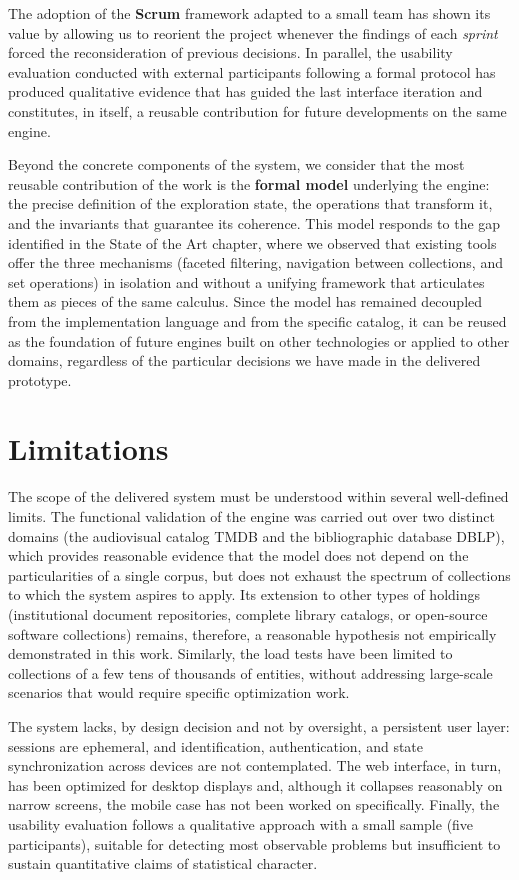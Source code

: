 The adoption of the \textbf{Scrum} framework adapted to a small team has shown its value by
allowing us to reorient the project whenever the findings of each \textit{sprint} forced the
reconsideration of previous decisions. In parallel, the usability evaluation conducted with
external participants following a formal protocol has produced qualitative evidence that has
guided the last interface iteration and constitutes, in itself, a reusable contribution for
future developments on the same engine.

Beyond the concrete components of the system, we consider that the most reusable contribution
of the work is the \textbf{formal model} underlying the engine: the precise definition of the
exploration state, the operations that transform it, and the invariants that guarantee its
coherence. This model responds to the gap identified in the State of the Art chapter, where
we observed that existing tools offer the three mechanisms (faceted filtering, navigation
between collections, and set operations) in isolation and without a unifying framework that
articulates them as pieces of the same calculus. Since the model has remained decoupled from
the implementation language and from the specific catalog, it can be reused as the foundation
of future engines built on other technologies or applied to other domains, regardless of the
particular decisions we have made in the delivered prototype.

\section*{Limitations}

The scope of the delivered system must be understood within several well-defined limits. The
functional validation of the engine was carried out over two distinct domains (the audiovisual
catalog TMDB and the bibliographic database DBLP), which provides reasonable evidence that the
model does not depend on the particularities of a single corpus, but does not exhaust the
spectrum of collections to which the system aspires to apply. Its extension to other types of
holdings (institutional document repositories, complete library catalogs, or open-source
software collections) remains, therefore, a reasonable hypothesis not empirically demonstrated
in this work. Similarly, the load tests have been limited to collections of a few tens of
thousands of entities, without addressing large-scale scenarios that would require specific
optimization work.

The system lacks, by design decision and not by oversight, a persistent user layer: sessions
are ephemeral, and identification, authentication, and state synchronization across devices are
not contemplated. The web interface, in turn, has been optimized for desktop displays and,
although it collapses reasonably on narrow screens, the mobile case has not been worked on
specifically. Finally, the usability evaluation follows a qualitative approach with a small
sample (five participants), suitable for detecting most observable problems
but insufficient to sustain quantitative claims of statistical character.


